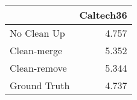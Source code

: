 \begin{tabular}{lr}
\toprule
{} & Caltech36 \\
\midrule
No Clean Up  &     4.757 \\
Clean-merge  &     5.352 \\
Clean-remove &     5.344 \\
Ground Truth &     4.737 \\
\bottomrule
\end{tabular}

